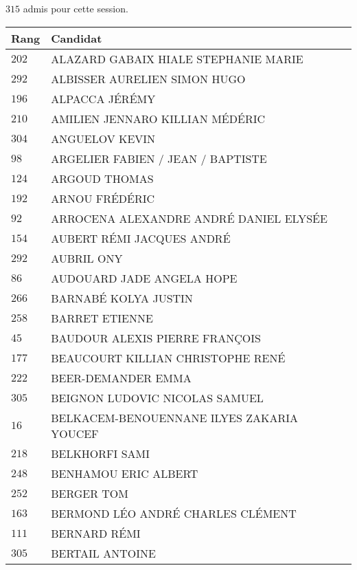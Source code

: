 



  $315$ admis pour cette session.

  \begin{xltabular}{\linewidth}{|l|X|}
    \hline
    \textbf{Rang} & \textbf{Candidat} \\
    \hline
    $202$ & ALAZARD GABAIX HIALE STEPHANIE MARIE \\
    \hline
    $292$ & ALBISSER AURELIEN SIMON HUGO \\
    \hline
    $196$ & ALPACCA JÉRÉMY \\
    \hline
    $210$ & AMILIEN JENNARO KILLIAN MÉDÉRIC \\
    \hline
    $304$ & ANGUELOV KEVIN \\
    \hline
    $98$ & ARGELIER FABIEN / JEAN / BAPTISTE \\
    \hline
    $124$ & ARGOUD THOMAS \\
    \hline
    $192$ & ARNOU FRÉDÉRIC \\
    \hline
    $92$ & ARROCENA ALEXANDRE ANDRÉ DANIEL ELYSÉE \\
    \hline
    $154$ & AUBERT RÉMI JACQUES ANDRÉ \\
    \hline
    $292$ & AUBRIL ONY \\
    \hline
    $86$ & AUDOUARD JADE ANGELA HOPE \\
    \hline
    $266$ & BARNABÉ KOLYA JUSTIN \\
    \hline
    $258$ & BARRET ETIENNE \\
    \hline
    $45$ & BAUDOUR ALEXIS PIERRE FRANÇOIS \\
    \hline
    $177$ & BEAUCOURT KILLIAN CHRISTOPHE RENÉ \\
    \hline
    $222$ & BEER-DEMANDER EMMA \\
    \hline
    $305$ & BEIGNON LUDOVIC NICOLAS SAMUEL \\
    \hline
    $16$ & BELKACEM-BENOUENNANE ILYES ZAKARIA YOUCEF \\
    \hline
    $218$ & BELKHORFI SAMI \\
    \hline
    $248$ & BENHAMOU ERIC ALBERT \\
    \hline
    $252$ & BERGER TOM \\
    \hline
    $163$ & BERMOND LÉO ANDRÉ CHARLES CLÉMENT \\
    \hline
    $111$ & BERNARD RÉMI \\
    \hline
    $305$ & BERTAIL ANTOINE \\

\end{xltabular}

